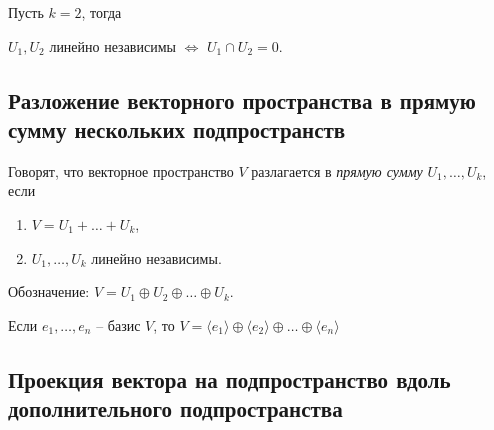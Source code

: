 \begin{corollary}
    Пусть $k = 2$, тогда

    $U_1, U_2$ линейно независимы $\iff$ $U_1 \cap U_2 = 0$.
\end{corollary}


\subsection{Разложение векторного пространства в прямую сумму нескольких подпространств}

\begin{definition}
    Говорят, что векторное пространство $V$ разлагается в \textit{прямую сумму} $U_1, \dots, U_k$, если
    \begin{enumerate}
    \item $V = U_1 + \dots + U_k$,
    \item $U_1, \dots, U_k$ линейно независимы.
    \end{enumerate}

    Обозначение: $V = U_1 \oplus U_2 \oplus \dots \oplus U_k$.
\end{definition}

\begin{example}
    Если $e_1, \dots, e_n$ -- базис $V$, то $V = \langle e_1 \rangle \oplus \langle e_2 \rangle \oplus \dots \oplus \langle e_n \rangle$
\end{example}


\subsection{Проекция вектора на подпространство вдоль дополнительного подпространства}

\begin{comment}
    При $k = 2$:
    \begin{enumerate}
    \item $V = U_1 \oplus U_2 \iff \begin{cases}
        V = U_1 + U_2, \\
        U_1 \cap U_2 = 0,
    \end{cases}$
    \item $V = U_1 \oplus U_2 \implies \forall v \in V \ \exists! u_1 \in U_1, u_2 \in U_2$, такие что $v = u_1 + u_2$.

        Тогда, $u_1$ называется проекцией вектора $v$ на $U_1$ вдоль $U_2$.
        
        Так же, $u_2$ называется проекцией вектора $v$ на $U_2$ вдоль $U_1$.
    \end{enumerate}
\end{comment}
